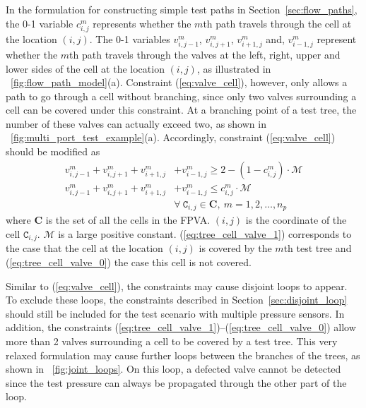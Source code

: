 In the formulation for constructing simple test paths  
in Section~\ref{sec:flow_paths}, the 0-1 variable $c^m_{i,j}$ represents
whether the $m$th path travels through the cell at the location $(i,j)$.  The
0-1 variables $v_{i, j-1}^m$, $v_{i, j+1}^m$, $v_{i+1, j}^m$ and, $v_{i-1,
j}^m$ represent whether the $m$th path travels through the valves at the left,
right, upper and lower sides of the cell at the location $(i,j)$, as
illustrated in \figname~\ref{fig:flow_path_model}(a). Constraint
(\ref{eq:valve_cell}), however, only allows a path to go through a cell without
branching, since only two valves surrounding a cell can be covered under this
constraint. At a branching point of a test tree, the number of these valves
can actually exceed two, as shown in
\figname~\ref{fig:multi_port_test_example}(a). Accordingly, constraint (\ref{eq:valve_cell}) 
should be modified as
\begin{align}\label{eq:tree_cell_valve_1}
v_{i, j-1}^m + v_{i, j+1}^m + v_{i+1, j}^m& + v_{i-1, j}^m \ge 2-(1-c^m_{i,j})\cdot\mathcal{M}  \\
\label{eq:tree_cell_valve_0}
v_{i, j-1}^m + v_{i, j+1}^m + v_{i+1, j}^m&+ v_{i-1, j}^m \le c^m_{i,j} \cdot\mathcal{M}  \\
 &\forall\ \mathtt{C}_{i,j}\in \mathbf{C}, \ m=1, 2,\dots, n_p\nonumber
\end{align}
where $\mathbf{C}$ is the set of all the cells in the FPVA.
$(i,j)$ is the coordinate of the cell $\mathtt{C}_{i,j}$.
$\mathcal{M}$ is a large positive constant.
(\ref{eq:tree_cell_valve_1}) 
corresponds to the case that the cell at the location $(i,j)$ is covered by the
$m$th test tree
and (\ref{eq:tree_cell_valve_0}) the case this cell is not covered.

Similar to (\ref{eq:valve_cell}), the constraints
\text{(\ref{eq:tree_cell_valve_1})--(\ref{eq:tree_cell_valve_0})} may cause
disjoint loops to appear. To exclude these loops, 
the constraints described in Section~\ref{sec:disjoint_loop} should still be
included for the test scenario with multiple pressure sensors.
In addition,
the constraints (\ref{eq:tree_cell_valve_1})--(\ref{eq:tree_cell_valve_0}) allow  
more than 2 valves surrounding a cell to be covered by a test tree.
This very relaxed formulation may cause further loops between the branches of the trees, 
as shown in \figname~\ref{fig:joint_loops}. On this loop, a defected valve
cannot be detected since the test pressure can always be propagated through the
other part of the loop.

